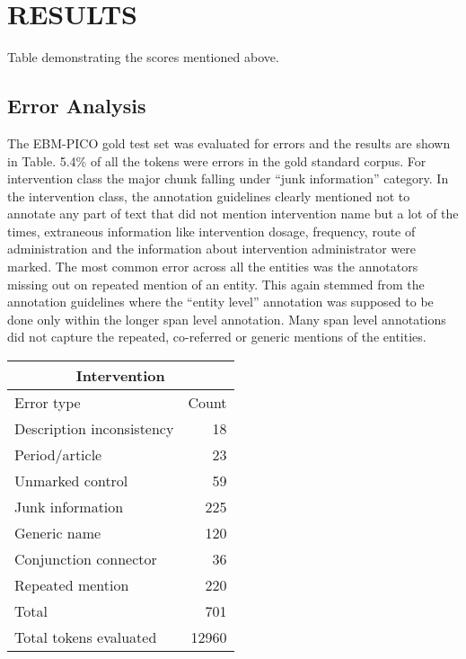 \documentclass[10.7pt,]{article}
\begin{document}
\section{RESULTS}\label{results}
%
Table demonstrating the scores mentioned above.
%
%
%
\subsection{Error Analysis}\label{subsec:err}
%
The EBM-PICO gold test set was evaluated for errors and the results are shown in Table.
5.4\% of all the tokens were errors in the gold standard corpus.
For intervention class the major chunk falling under ``junk information'' category. In the intervention class, the annotation guidelines clearly mentioned not to annotate any part of text that did not mention intervention name but a lot of the times, extraneous information like intervention dosage, frequency, route of administration and the information about intervention administrator were marked. 
The most common error across all the entities was the annotators missing out on repeated mention of an entity. 
This again stemmed from the annotation guidelines where the ``entity level'' annotation was supposed to be done only within the longer span level annotation.
Many span level annotations did not capture the repeated, co-referred or generic mentions of the entities. 

\begin{table}[!ht]
    \centering
    \begin{tabular}{|l|r|}
    \hline
    \multicolumn{2}{|c|}{Intervention} \\
    \hline
    Error type & Count \\
    \hline
        Description inconsistency & 18 \\
        Period/article & 23 \\ 
        Unmarked control & 59 \\ 
        Junk information & 225 \\ 
        Generic name & 120 \\ 
        Conjunction connector & 36 \\ 
        Repeated mention & 220 \\ 
        Total & 701 \\ 
        Total tokens evaluated & 12960 \\ \hline
    \end{tabular}
\end{table}
%
%
%
\end{document}
